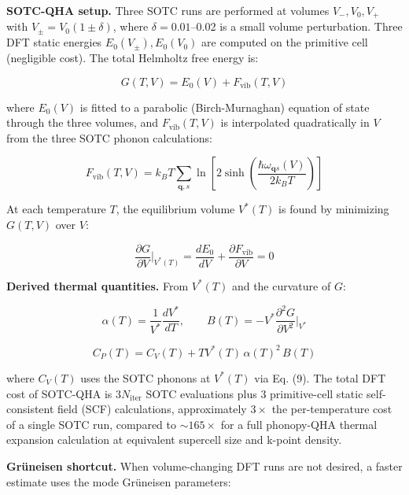 \documentclass[aps,prb,reprint,amsmath,amssymb,floatfix]{revtex4-2}
\begin{document}
\textbf{SOTC-QHA setup.} Three SOTC runs are performed at volumes
\(V_-, V_0, V_+\) with \(V_\pm = V_0(1 \pm \delta)\), where
\(\delta = 0.01\)--0.02 is a small volume perturbation. Three DFT static
energies \(E_0(V_\pm), E_0(V_0)\) are computed on the primitive cell
(negligible cost). The total Helmholtz free energy is:

\begin{equation}
G(T,V) = E_0(V) + F_\text{vib}(T,V) \tag{13}
\end{equation}

where \(E_0(V)\) is fitted to a parabolic (Birch-Murnaghan) equation of
state through the three volumes, and \(F_\text{vib}(T,V)\) is
interpolated quadratically in \(V\) from the three SOTC phonon
calculations:

\begin{equation}
F_\text{vib}(T,V) = k_BT\sum_{\mathbf{q},s}\ln\!\left[2\sinh\!\left(\frac{\hbar\omega_{\mathbf{q}s}(V)}{2k_BT}\right)\right] \tag{14}
\end{equation}

At each temperature \(T\), the equilibrium volume \(V^*(T)\) is found by
minimizing \(G(T,V)\) over \(V\):

\begin{equation}
\frac{\partial G}{\partial V}\bigg|_{V^*(T)} = \frac{dE_0}{dV} + \frac{\partial F_\text{vib}}{\partial V} = 0 \tag{15}
\end{equation}

\textbf{Derived thermal quantities.} From \(V^*(T)\) and the curvature
of \(G\):

\begin{equation}
\alpha(T) = \frac{1}{V^*}\frac{dV^*}{dT}, \qquad B(T) = -V^*\frac{\partial^2 G}{\partial V^2}\bigg|_{V^*} \tag{16}
\end{equation}

\begin{equation}
C_P(T) = C_V(T) + TV^*(T)\,\alpha(T)^2\,B(T) \tag{17}
\end{equation}

where \(C_V(T)\) uses the SOTC phonons at \(V^*(T)\) via Eq. (9). The
total DFT cost of SOTC-QHA is \(3N_\text{iter}\) SOTC evaluations plus 3
primitive-cell static self-consistent field (SCF) calculations,
approximately \(3\times\) the per-temperature cost of a single SOTC run,
compared to $\sim165\times$ for a full phonopy-QHA thermal
expansion calculation at equivalent supercell size and k-point density.

\textbf{Grüneisen shortcut.} When volume-changing DFT runs are not
desired, a faster estimate uses the mode Grüneisen parameters:
\end{document}
